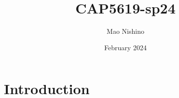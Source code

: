 \documentclass{article}
\title{CAP5619-sp24}
\author{Mao Nishino}
\date{February 2024}
\begin{document}
\maketitle

\section{Introduction}
\end{document}
